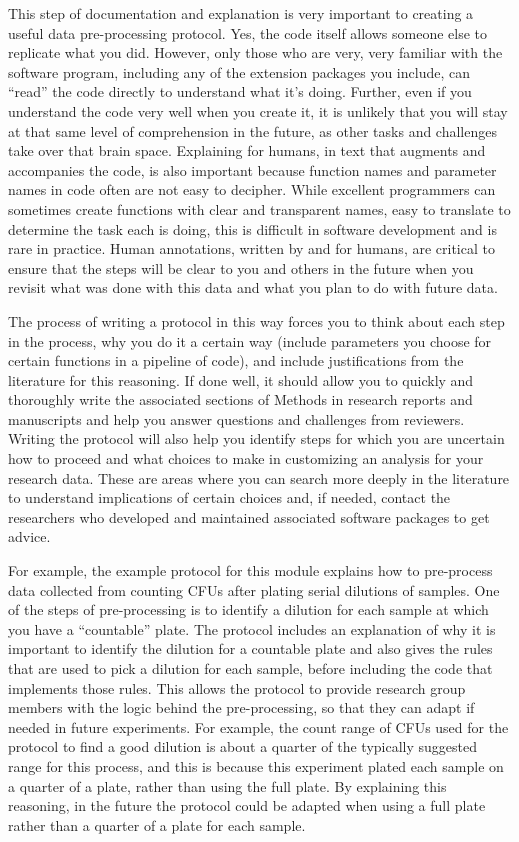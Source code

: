 \documentclass[]{tufte-book}
\begin{document}
This step of documentation and explanation is very important to creating a
useful data pre-processing protocol. Yes, the code itself allows someone else to
replicate what you did. However, only those who are very, very familiar with the
software program, including any of the extension packages you include, can
``read'' the code directly to understand what it's doing. Further, even if you
understand the code very well when you create it, it is unlikely that you will
stay at that same level of comprehension in the future, as other tasks and
challenges take over that brain space. Explaining for humans, in text that
augments and accompanies the code, is also important because function names and
parameter names in code often are not easy to decipher. While excellent
programmers can sometimes create functions with clear and transparent names,
easy to translate to determine the task each is doing, this is difficult in
software development and is rare in practice. Human annotations, written by and
for humans, are critical to ensure that the steps will be clear to you and
others in the future when you revisit what was done with this data and what you
plan to do with future data.

The process of writing a protocol in this way forces you to think about each
step in the process, why you do it a certain way (include parameters you choose
for certain functions in a pipeline of code), and include justifications from
the literature for this reasoning. If done well, it should allow you to quickly
and thoroughly write the associated sections of Methods in research reports and
manuscripts and help you answer questions and challenges from reviewers. Writing
the protocol will also help you identify steps for which you are uncertain how
to proceed and what choices to make in customizing an analysis for your research
data. These are areas where you can search more deeply in the literature to
understand implications of certain choices and, if needed, contact the
researchers who developed and maintained associated software packages to get
advice.

For example, the example protocol for this module explains how to pre-process
data collected from counting CFUs after plating serial dilutions of samples. One
of the steps of pre-processing is to identify a dilution for each sample at
which you have a ``countable'' plate. The protocol includes an explanation of why
it is important to identify the dilution for a countable plate and also gives
the rules that are used to pick a dilution for each sample, before including the
code that implements those rules. This allows the protocol to provide research
group members with the logic behind the pre-processing, so that they can adapt
if needed in future experiments. For example, the count range of CFUs used for
the protocol to find a good dilution is about a quarter of the typically
suggested range for this process, and this is because this experiment plated
each sample on a quarter of a plate, rather than using the full plate. By
explaining this reasoning, in the future the protocol could be adapted when
using a full plate rather than a quarter of a plate for each sample.
\end{document}
